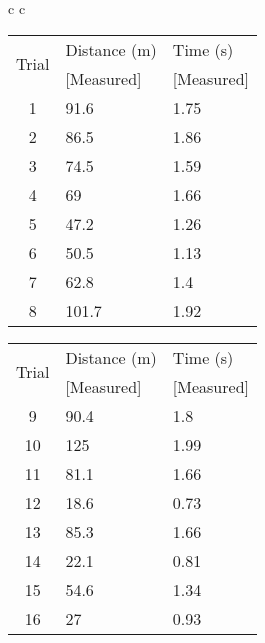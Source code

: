 \documentclass{article}
\begin{document}
\def\arraystretch{1.2}%
\begin{center}
    \begin{tabular}{c c}
        \begin{tabular}{ | c l l | }
            \hline
            \multirow{2}{2em}{Trial} & Distance (m) & Time (s)\\
                                 & [Measured] & [Measured]\\
            \hline
            1 & 91.6  & 1.75\\
            2 & 86.5  & 1.86\\
            3 & 74.5  & 1.59\\
            4 & 69    & 1.66\\
            5 & 47.2  & 1.26\\
            6 & 50.5  & 1.13\\
            7 & 62.8  & 1.4\\
            8 & 101.7 &	1.92\\
            \hline
        \end{tabular}

        \begin{tabular}{ | c l l | }
            \hline
            \multirow{2}{2em}{Trial} & Distance (m) & Time (s)\\
                                 & [Measured] & [Measured]\\
            \hline
            9 & 90.4  & 1.8\\
            10 & 125  & 1.99\\
            11 & 81.1 & 1.66\\
            12 & 18.6 & 0.73\\
            13 & 85.3 & 1.66\\
            14 & 22.1 & 0.81\\
            15 & 54.6 & 1.34\\
            16 & 27   & 0.93\\
            \hline
        \end{tabular}
    \end{tabular}
\end{center}
\end{document}
